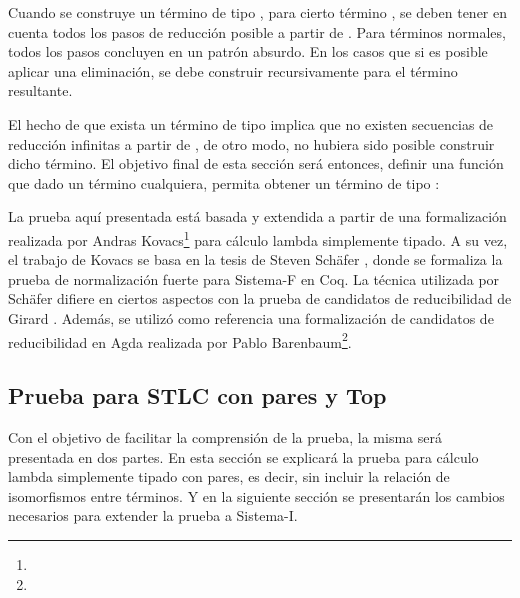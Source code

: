 \begin{example}
	Cuando se construye un término de tipo  , para cierto término , se deben tener en cuenta todos los pasos de reducción posible a partir de .
	Para términos normales, todos los pasos concluyen en un patrón absurdo.
	En los casos que si es posible aplicar una eliminación, se debe construir recursivamente  para el término resultante.
	
\end{example}

El hecho de que exista un término de tipo   implica que no existen secuencias de reducción infinitas a partir de , de otro modo, no hubiera sido posible construir dicho término.
El objetivo final de esta sección será entonces, definir una función que dado un término cualquiera, permita obtener un término de tipo  :

\vspace{0.5em}
\AgdaSymbol{:}
\AgdaSymbol{\{}
\AgdaSymbol{\}}
\AgdaSymbol{(}
\AgdaSymbol{:}
\AgdaSymbol{)}
\vspace{0.5em}

La prueba aquí presentada está basada y extendida a partir de una formalización realizada por 
Andras Kovacs\footnote{} para cálculo lambda simplemente tipado.
A su vez, el trabajo de Kovacs se basa en la tesis de Steven Schäfer \cite{Schafer}, donde se formaliza la prueba de normalización fuerte para Sistema-F en Coq.
La técnica utilizada por Schäfer difiere en ciertos aspectos con la prueba de candidatos de reducibilidad de Girard \cite{Girard}.
Además, se utilizó como referencia una formalización de candidatos de reducibilidad en Agda realizada por Pablo Barenbaum\footnote{}.

\subsection{Prueba para STLC con pares y Top}

Con el objetivo de facilitar la comprensión de la prueba, la misma será presentada en dos partes.
En esta sección se explicará la prueba para cálculo lambda simplemente tipado con pares, es decir, sin incluir la relación de isomorfismos entre términos.
Y en la siguiente sección se presentarán los cambios necesarios para extender la prueba a Sistema-I.


